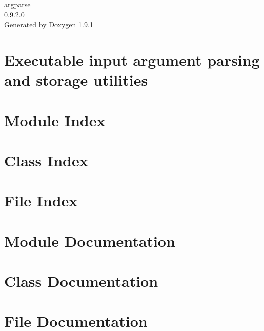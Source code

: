\let\mypdfximage\pdfximage\def\pdfximage{\immediate\mypdfximage}\documentclass[twoside]{book}
\newcommand{\+}{\discretionary{\mbox{\scriptsize$\hookleftarrow$}}{}{}}
\newcommand{\clearemptydoublepage}{%
  \newpage{\pagestyle{empty}\cleardoublepage}%
}
\begin{document}
\raggedbottom

\hypersetup{pageanchor=false,
             bookmarksnumbered=true,
             pdfencoding=unicode
            }
\begin{titlepage}
\vspace*{7cm}
\begin{center}%
{\Large argparse \\[1ex]\large 0.\+9.\+2.\+0 }\\
\vspace*{1cm}
{\large Generated by Doxygen 1.9.1}\\
\end{center}
\end{titlepage}
\clearemptydoublepage
{}
\tableofcontents
\clearemptydoublepage
{}
\hypersetup{pageanchor=true}

\chapter{Executable input argument parsing and storage utilities}
\label{index}\hypertarget{index}{}
\chapter{Module Index}

\chapter{Class Index}

\chapter{File Index}

\chapter{Module Documentation}

\chapter{Class Documentation}

\chapter{File Documentation}



\backmatter
\newpage
{}
\clearemptydoublepage
{}
\printindex
\end{document}
